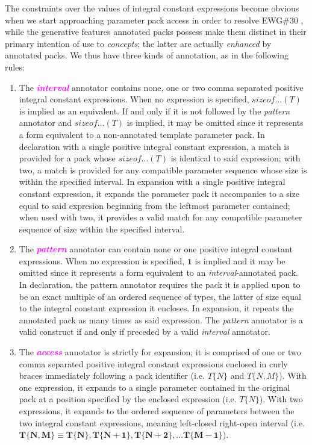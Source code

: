 \p The constraints over the values of integral constant expressions become obvious when we start approaching parameter pack access in order to resolve EWG\#30 \cite{Abrahams2012}, while the generative features annotated packs possess make them distinct in their primary intention of use to \textit{concepts}; the latter are actually \textit{enhanced} by annotated packs.
We thus have three kinds of annotation, as in the following rules:
\begin{enumerate}
\item\p The \textcolor{Magenta}{\textbf{\textit{interval}}} annotator contains none, one or two comma separated positive integral constant expressions.
When no expression is specified, $sizeof...(T)$ is implied as an equivalent.
If and only if it is not followed by the \textit{pattern} annotator and $sizeof...(T)$ is implied, it may be omitted since it represents a form equivalent to a non-annotated template parameter pack.
In declaration with a single positive integral constant expression, a match is provided for a pack whose $sizeof...(T)$ is identical to said expression; with two, a match is provided for any compatible parameter sequence whose size is within the specified interval.
In expansion with a single positive integral constant expression, it expands the parameter pack it accompanies to a size equal to said expresion beginning from the leftmost parameter contained;
when used with two, it provides a valid match for any compatible parameter sequence of size within the specified interval.

\item\p The \textcolor{Magenta}{\textbf{\textit{pattern}}} annotator can contain none or one positive integral constant expressions.
When no expression is specified, $\bm{1}$ is implied and it may be omitted since it represents a form equivalent to an \textit{interval}-annotated pack.
In declaration, the pattern annotator requires the pack it is applied upon to be an exact multiple of an ordered sequence of types, the latter of size equal to the integral constant expression it encloses. In expansion, it repeats the annotated pack as many times as said expression.
The \textit{pattern} annotator is a valid construct if and only if preceded by a valid \textit{interval} annotator.

\item\p The \textcolor{Magenta}{\textbf{\textit{access}}} annotator is strictly for expansion; it is comprised of one or two comma separated positive integral constant expressions enclosed in curly braces immediately following a pack identifier (i.e. $T\{N\}$ and $T\{N,M\}$).
With one expression, it expands to a single parameter contained in the original pack at a position specified by the enclosed expression (i.e. $T\{N\}$).
With two expressions, it expands to the ordered sequence of parameters between the two integral constant expressions, meaning left-closed right-open interval (i.e. $\bm{T\{N,M\} \equiv T\{N\},T\{N+1\},T\{N+2\},...T\{M-1\}}$).
\end{enumerate}

